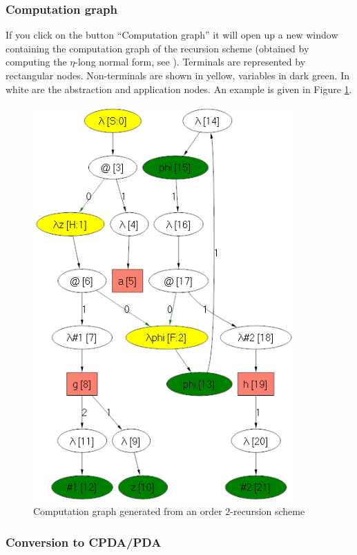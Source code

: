 \documentclass{article}
\begin{document}
\subsubsection{Computation graph}

If you click on the button ``Computation graph'' it will open up a new window containing the computation graph of the recursion scheme (obtained by computing the $\eta$-long normal form, see \cite{OngLics2006}).
Terminals are represented by rectangular nodes.
Non-terminals are shown in yellow, variables in dark green. In white
are the abstraction and application nodes. An example is given in Figure \ref{fig:compgraph}.

\begin{figure}[htbp]
  \begin{center}
  \includegraphics[width=10cm]{compgraph}
  \end{center}
  \caption{Computation graph generated from an order $2$-recursion scheme}\label{fig:compgraph}
\end{figure}


\subsubsection{Conversion to CPDA/PDA}
\end{document}
